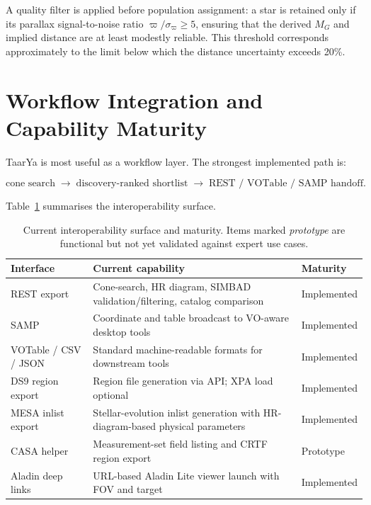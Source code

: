\documentclass[12pt]{elsarticle}
\newcommand{\parallax}{\varpi}
\begin{document}
A quality filter is applied before population assignment: a star is retained only if its parallax signal-to-noise ratio $\parallax / \sigma_\parallax \ge 5$, ensuring that the derived $M_G$ and implied distance are at least modestly reliable. This threshold corresponds approximately to the limit below which the distance uncertainty exceeds 20\%.

\section{Workflow Integration and Capability Maturity}
\label{sec:workflow}

\textsf{TaarYa} is most useful as a workflow layer. The strongest implemented path is:

\[
\text{cone search} \;\rightarrow\; \text{discovery-ranked shortlist}
\;\rightarrow\; \text{REST / VOTable / SAMP handoff}.
\]

Table~\ref{tab:interop} summarises the interoperability surface.

\begin{table}[htbp]
\centering
\caption{Current interoperability surface and maturity. Items marked \emph{prototype} are functional but not yet validated against expert use cases.}
\label{tab:interop}
\begin{tabularx}{\textwidth}{@{}p{2.8cm}Xl@{}}
\toprule
\textbf{Interface} & \textbf{Current capability} & \textbf{Maturity} \\
\midrule
REST export & Cone-search, HR diagram, SIMBAD validation/filtering, catalog comparison & Implemented \\
SAMP & Coordinate and table broadcast to VO-aware desktop tools & Implemented \\
VOTable / CSV / JSON & Standard machine-readable formats for downstream tools & Implemented \\
DS9 region export & Region file generation via API; XPA load optional & Implemented \\
MESA inlist export & Stellar-evolution inlist generation with HR-diagram-based physical parameters & Implemented \\
CASA helper & Measurement-set field listing and CRTF region export & Prototype \\
Aladin deep links & URL-based Aladin Lite viewer launch with FOV and target & Implemented \\
\bottomrule
\end{tabularx}
\end{table}
\end{document}
